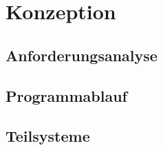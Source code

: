 \chapter{Konzeption}
\label{chapter4}


\section{Anforderungsanalyse}
\label{4-Anforderungsanalyse}


\section{Programmablauf}
\label{4-Programmablauf}


\section{Teilsysteme}
\label{4-Teilsysteme}